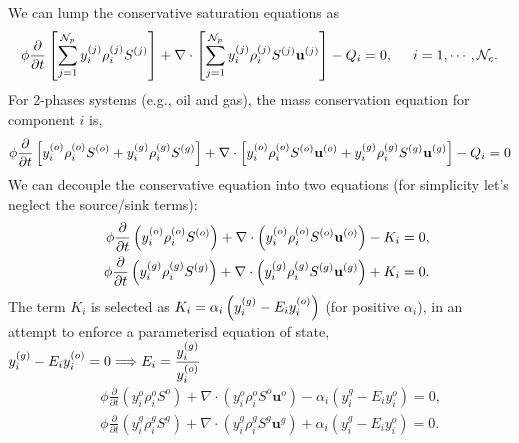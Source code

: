 We can lump the conservative saturation equations as
    \begin{equation}
              \phi \displaystyle\frac{\partial}{\partial t}\left[\summation_{j=1}^{{\cal N}_p}\mfr[y]{i}{j}\mfr[\rho]{i}{j}\mfr[S]{}{j}\right] + \nabla\cdot\left[\summation_{j=1}^{{\cal N}_p}\mfr[y]{i}{j}\mfr[\rho]{i}{j}\mfr[S]{}{j}\mfr[\mathbf{u}]{}{j}\right] - Q_{i} = 0, \hspace{.5cm} i = 1, \cdots, \mathcal{N}_{c}. \label{saturation_compositional_4}
    \end{equation} 
For 2-phases systems (e.g., oil and gas), the mass conservation equation for component $i$ is,  
     \begin{displaymath}
             \phi \displaystyle\frac{\partial}{\partial t}\left[\mfr[y]{i}{o}\mfr[\rho]{i}{o}\mfr[S]{}{o} +  \mfr[y]{i}{g}\mfr[\rho]{i}{g}\mfr[S]{}{g}\right] + \nabla\cdot\left[\mfr[y]{i}{o} \mfr[\rho]{i}{o}\mfr[S]{}{o}\mfr[\mathbf{u}]{}{o} + \mfr[y]{i}{g}\mfr[\rho]{i}{g}\mfr[S]{}{g}\mfr[\mathbf{u}]{}{g} \right] - Q_{i} = 0
    \end{displaymath}
We can decouple the conservative equation into two equations (for simplicity let's neglect the source/sink terms): 
          \begin{eqnarray}
             && \phi \displaystyle\frac{\partial}{\partial t}\left(\mfr[y]{i}{o}\mfr[\rho]{i}{o}\mfr[S]{}{o} \right) + \nabla\cdot\left(\mfr[y]{i}{o}\mfr[\rho]{i}{o}\mfr[S]{}{o}\mfr[\mathbf{u}]{}{o}  \right) - K_{i}  = 0, \nonumber \\
             && \phi \displaystyle\frac{\partial}{\partial t}\left(\mfr[y]{i}{g}\mfr[\rho]{i}{g}\mfr[S]{}{g}  \right) + \nabla\cdot\left(\mfr[y]{i}{g}\mfr[\rho]{i}{g}\mfr[S]{}{g}\mfr[\mathbf{u}]{}{g} \right) + K_{i} = 0.  \nonumber
          \end{eqnarray}
The term $K_{i}$ is selected as $K_{i}=\alpha_i \left(\mfr[y]{i}{g} - E_{i} \mfr[y]{i}{o}\right)$ (for positive $\alpha_{i}$), in an attempt to enforce a parameterisd equation of state, $\mfr[y]{i}{g} - E_{i} \mfr[y]{i}{o}=0 \Longrightarrow E_{i}=\frc{\mfr[y]{i}{g}}{\mfr[y]{i}{o}}$
           \begin{eqnarray}
               && \phi  \displaystyle\frac{\partial}{\partial t}\left(y_{i}^{o}\rho_i^{o}S^{o} \right) + \nabla\cdot\left(y_{i}^{o}\rho_i^{o}S^{o}\mathbf{u}^{o}  \right) - \alpha_i (y_i^g - E_i y_i^o)  = 0, \label{oil-comp-i} \nonumber\\
               && \phi \displaystyle\frac{\partial}{\partial t}\left(y_{i}^{g}\rho_i^{g}S^{g}  \right) +  \nabla\cdot\left( y_{i}^{g}\rho_i^{g}S^{g}\mathbf{u}^{g}  \right) + \alpha_i (y_i^g - E_i y_i^o) = 0. \label{water-comp-i} \nonumber\label{Chapter:CompositionalModel:Section:MultiComponentFormulation:Section:2PhaseSystem:Eqn:MassConservationSaturation}
           \end{eqnarray}

